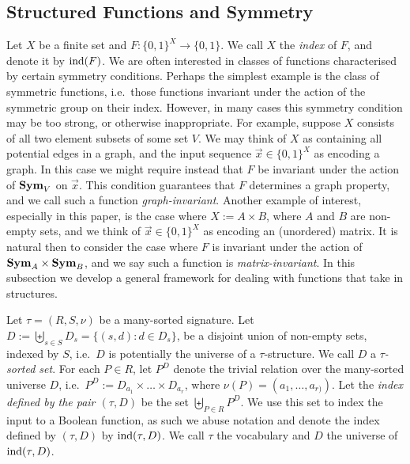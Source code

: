 \documentclass[../paper.tex]{subfiles}
\begin{document}


\subsection{Structured Functions and Symmetry}
Let $X$ be a finite set and $F: \{0,1\}^{X} \rightarrow \{0,1\}$. We call $X$
the \emph{index} of $F$, and denote it by $\text{\upshape ind}(F)$. We are often interested in
classes of functions characterised by certain symmetry conditions. Perhaps the
simplest example is the class of symmetric functions, i.e.\ those functions
invariant under the action of the symmetric group on their index. However, in
many cases this symmetry condition may be too strong, or otherwise
inappropriate. For example, suppose $X$ consists of all two element subsets of
some set $V$. We may think of $X$ as containing all potential edges in a graph,
and the input sequence $ \vec{x} \in \{0,1\}^X$ as encoding a graph. In this
case we might require instead that $F$ be invariant under the action of $\text{\textbf{Sym}}_V$
on $\vec{x}$. This condition guarantees that $F$ determines a graph property,
and we call such a function \emph{graph-invariant}. Another example of interest,
especially in this paper, is the case where $X := A \times B$, where $A$ and $B$
are non-empty sets, and we think of $\vec{x} \in \{0,1\}^X$ as encoding an
(unordered) matrix. It is natural then to consider the case where $F$ is
invariant under the action of $\text{\textbf{Sym}}_A \times \text{\textbf{Sym}}_B$, and we say such a function
is \emph{matrix-invariant}. In this subsection we develop a general framework
for dealing with functions that take in structures.

Let $\tau = (R, S, \nu)$ be a many-sorted signature.
Let $D := \biguplus_{s \in S} D_{s} = \{(s,d) : d \in D_s\}$, be a
disjoint union of non-empty sets, indexed by $S$, i.e.\ $D$ is
potentially the universe of a $\tau$-structure. We call $D$ a \emph{$\tau$-sorted set}.
For each $P \in R$, let $P^D$ denote the trivial relation over the
many-sorted universe $D$, i.e.\ $P^D := D_{a_1} \times \ldots \times
D_{a_{r}}$, where $\nu(P) = (a_1, \ldots , a_{r)})$.   Let the \emph{index defined by the pair $(\tau, D)$} be
the set $\biguplus_{P\in R} P^{D}$.  We use this set to index the input to a Boolean
function, as such we abuse notation and denote the index defined by
$(\tau, D)$ by $\text{\upshape ind}(\tau, D)$. We call $\tau$ the vocabulary and $D$ the universe of $\text{\upshape ind}(\tau, D)$.
\end{document}
